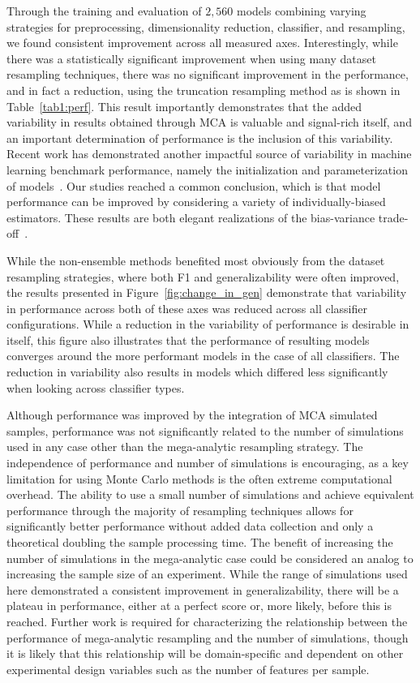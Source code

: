 \documentclass[10pt]{SelfArx} %
\newcommand{\new}[1]{\color{blue}#1\color{black}\xspace}
\begin{document}
Through the training and evaluation of $2,560$ models combining varying strategies for preprocessing, dimensionality
reduction, classifier, and resampling, we found consistent improvement across all measured axes. Interestingly, while
there was a statistically significant improvement when using many dataset resampling techniques, there was no
significant improvement in the performance, and in fact a reduction, using the truncation resampling method as is shown
in Table~\ref{tab1:perf}. This result importantly demonstrates that the added variability in results obtained through
MCA is valuable and signal-rich itself, and an important determination of performance is the inclusion of this
variability. \new{Recent work has demonstrated another impactful source of variability in machine learning benchmark
performance, namely the initialization and parameterization of models~\cite{bouthillier2021accounting}. Our studies
reached a common conclusion, which is that model performance can be improved by considering a variety of
individually-biased estimators. These results are both elegant realizations of the bias-variance
trade-off~\cite{geman1992neural}}.

While the non-ensemble methods benefited most obviously from the dataset resampling strategies, where both F1 and
generalizability were often improved, the results presented in Figure~\ref{fig:change_in_gen} demonstrate that
variability in performance across both of these axes was reduced across all classifier configurations. While a
reduction in the variability of performance is desirable in itself, this figure also illustrates that the performance
of resulting models converges around the more performant models in the case of all classifiers. The reduction in
variability also results in models which differed less significantly when looking across classifier types.

Although performance was improved by the integration of MCA simulated samples, performance was not significantly
related to the number of simulations used in any case other than the mega-analytic resampling strategy. The
independence of performance and number of simulations is encouraging, as a key limitation for using Monte Carlo methods
is the often extreme computational overhead. The ability to use a small number of simulations and achieve equivalent
performance through the majority of resampling techniques allows for significantly better performance without added
data collection and only a theoretical doubling the sample processing time. The benefit of increasing the number of
simulations in the mega-analytic case could be considered an analog to increasing the sample size of an experiment.
While the range of simulations used here demonstrated a consistent improvement in generalizability, there will be a
plateau in performance, either at a perfect score or, more likely, before this is reached. Further work is required for
characterizing the relationship between the performance of mega-analytic resampling and the number of simulations,
though it is likely that this relationship will be domain-specific and dependent on other experimental design variables
such as the number of features per sample.
\end{document}
